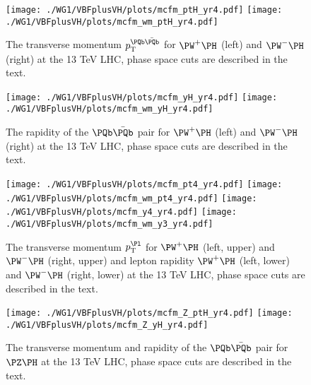 \begin{figure}
\begin{center}
\texttt{[image: ./WG1/VBFplusVH/plots/mcfm\_ptH\_yr4.pdf]}
\texttt{[image: ./WG1/VBFplusVH/plots/mcfm\_wm\_ptH\_yr4.pdf]}
\end{center}
\caption{The transverse momentum $p_{\mathrm{T}}^{\PQb\bar\PQb}$ for $\PW^+\PH$ (left) and $\PW^-\PH$ (right) at the 13 TeV LHC, phase space cuts are described in the text.}
\label{fig:plots1}
\end{figure}

\begin{figure}
\begin{center}
\texttt{[image: ./WG1/VBFplusVH/plots/mcfm\_yH\_yr4.pdf]}
\texttt{[image: ./WG1/VBFplusVH/plots/mcfm\_wm\_yH\_yr4.pdf]}
\end{center}
\caption{The rapidity of the $\PQb\bar\PQb$ pair for $\PW^+\PH$ (left) and $\PW^-\PH$ (right) at the 13 TeV LHC, phase space cuts are described in the text.}
\label{fig:plots2}
\end{figure}

\begin{figure}
\begin{center}
\texttt{[image: ./WG1/VBFplusVH/plots/mcfm\_pt4\_yr4.pdf]}
\texttt{[image: ./WG1/VBFplusVH/plots/mcfm\_wm\_pt4\_yr4.pdf]}
\texttt{[image: ./WG1/VBFplusVH/plots/mcfm\_y4\_yr4.pdf]} \; \;
\texttt{[image: ./WG1/VBFplusVH/plots/mcfm\_wm\_y3\_yr4.pdf]}
\end{center}
\caption{The transverse momentum $p_{\mathrm{T}}^{\Pl}$ for $\PW^+\PH$ (left, upper) and $\PW^-\PH$ (right, upper) and
lepton rapidity $\PW^+\PH$ (left, lower) and $\PW^-\PH$ (right, lower)  at the 13 TeV LHC, phase space cuts are described in the text.}
\label{fig:plots3}
\end{figure}

\begin{figure}
\begin{center}
\texttt{[image: ./WG1/VBFplusVH/plots/mcfm\_Z\_ptH\_yr4.pdf]}
\texttt{[image: ./WG1/VBFplusVH/plots/mcfm\_Z\_yH\_yr4.pdf]}
\end{center}
\caption{The transverse momentum and rapidity of the $\PQb\bar\PQb$ pair for $\PZ\PH$  at the 13 TeV LHC, phase space cuts are described in the text.}
\label{fig:plots4}
\end{figure}

